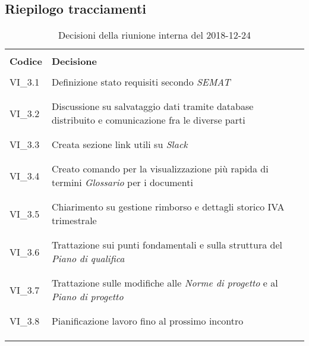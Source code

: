 \subsection{Riepilogo tracciamenti}
\begin{centering}
\begin{longtable}{ >{\centering}p{4cm} >{\centering}p{11cm} }

\hline
\\[0.5pt]
	\textbf{Codice} & \textbf{Decisione} 
	
	\tabularnewline 
	\hline
	
	
				\\[0.5pt]
				VI\_3.1 & Definizione stato requisiti secondo \textit{SEMAT}
				\\[0.5pt]
				\tabularnewline
				\hline
						
				\\[0.5pt]
				VI\_3.2 & Discussione su salvataggio dati tramite database distribuito e comunicazione fra le diverse parti
				\\[0.5pt]
				\tabularnewline
				\hline
				
				\\[0.5pt]
				VI\_3.3 & Creata sezione link utili su \textit{Slack}
				\\[0.5pt]
				\tabularnewline
				\hline
				
				\\[0.5pt]				
				VI\_3.4 & Creato comando per la visualizzazione più rapida di termini \textit{Glossario} per i documenti
				\\[0.5pt]
				\tabularnewline
				\hline
				
				\\[0.5pt]
				VI\_3.5 & Chiarimento su gestione rimborso e dettagli storico IVA trimestrale
				\\[0.5pt]
				\tabularnewline
				\hline
				
				\\[0.5pt]
				VI\_3.6 & Trattazione sui punti fondamentali e sulla struttura del \textit{Piano di qualifica}
				\\[0.5pt]
				\tabularnewline
				\hline
		
				\\[0.5pt]
				VI\_3.7 & Trattazione sulle modifiche alle \textit{Norme di progetto} e al \textit{Piano di progetto}
				\\[0.5pt]
				\tabularnewline
				\hline          	
                
                \\[0.5pt]
                VI\_3.8 & Pianificazione lavoro fino al prossimo incontro
                \\[0.5pt]
                \tabularnewline
                \hline  
                
        \\[0.7pt]
        \caption{Decisioni della riunione interna del 2018-12-24}
\end{longtable}
\end{centering}

